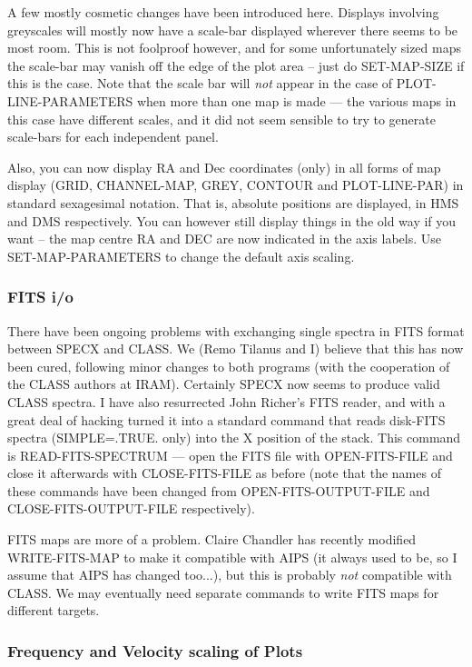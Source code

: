 \documentclass[twoside,11pt]{article}
\renewcommand{\_}{\texttt{\symbol{95}}}
\begin{document}
A few mostly cosmetic changes have been introduced here. Displays involving
greyscales will mostly now have a scale-bar displayed wherever there seems
to be most room. This is not foolproof however, and for some unfortunately
sized maps the scale-bar may vanish off the edge of the plot area -- just
do SET-MAP-SIZE if this is the case. Note that the scale bar will \emph{not}
appear in the case of PLOT-LINE-PARAMETERS when more than one map is made ---
the various maps in this case have different scales, and it did not seem
sensible to try to generate scale-bars for each independent panel.

Also, you can now display RA and Dec coordinates (only) in all forms of
map display (GRID, CHANNEL-MAP, GREY, CONTOUR and PLOT-LINE-PAR) in 
standard sexagesimal notation. That is, absolute positions are displayed,
in HMS and DMS respectively. You can however still display things in the
old way if you want -- the map centre RA and DEC are now indicated in the
axis labels. Use SET-MAP-PARAMETERS to change the default axis scaling.


\subsubsection{FITS i/o}

There have been ongoing problems with exchanging single spectra in FITS
format between SPECX and CLASS. We (Remo Tilanus and I) believe that
this has now been cured, following minor changes to both programs (with
the cooperation of the CLASS authors at IRAM). Certainly SPECX now
seems to produce valid CLASS spectra. I have also resurrected John
Richer's FITS reader, and with a great deal of hacking turned it into a
standard command that reads disk-FITS spectra (SIMPLE=.TRUE. only) into
the X position of the stack. This command is READ-FITS-SPECTRUM   ---
open the FITS file with OPEN-FITS-FILE and close it afterwards with
CLOSE-FITS-FILE as before (note that the names of these commands have
been changed from OPEN-FITS-OUTPUT-FILE and CLOSE-FITS-OUTPUT-FILE
respectively).

FITS maps are more of a problem. Claire Chandler has recently modified
WRITE-FITS-MAP to make it compatible with AIPS (it always used to be, so I
assume that AIPS has changed too...), but this is probably \emph{not}
compatible with CLASS. We may eventually need separate commands to write FITS
maps for different targets.


\subsubsection{Frequency and Velocity scaling of Plots}
\end{document}
